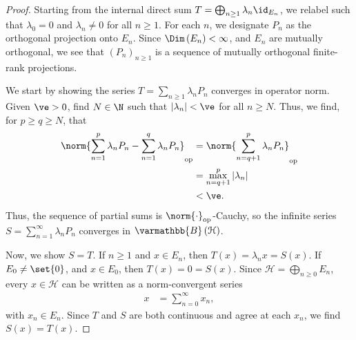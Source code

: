 \documentclass[10pt]{mypackage}
\renewcommand*{\mathbb}[1]{\varmathbb{#1}}
\newcommand{\B}{\mathbb{B}}
\begin{document}
\begin{proof}
  Starting from the internal direct sum $T = \bigoplus_{n\geq 1}\lambda_n\id_{E_n}$, we relabel such that $\lambda_0 = 0$ and $\lambda_n \neq 0$ for all $n\geq 1$. For each $n$, we designate $P_n$ as the orthogonal projection onto $E_n$. Since $\Dim\left(E_n\right) < \infty$, and $E_n$ are mutually orthogonal, we see that $\left(P_n\right)_{n\geq 1}$ is a sequence of mutually orthogonal finite-rank projections.\newline

  We start by showing the series $T = \sum_{n \geq 1}\lambda_nP_n$ converges in operator norm. Given $\ve > 0$, find $N\in \N$ such that $\left\vert \lambda_n \right\vert < \ve$ for all $n\geq N$. Thus, we find, for $p\geq q \geq N$, that
  \begin{align*}
    \norm{\sum_{n=1}^{p}\lambda_nP_n - \sum_{n=1}^{q}\lambda_nP_n}_{\text{op}} &= \norm{\sum_{n=q+1}^{p}\lambda_nP_n}_{\text{op}}\\
                                                                               &= \max_{n=q+1}^{p}\left\vert \lambda_n \right\vert\\
                                                                               & < \ve.
  \end{align*}
  Thus, the sequence of partial sums is $\norm{\cdot}_{\text{op}}$-Cauchy, so the infinite series $S = \sum_{n=1}^{\infty}\lambda_nP_n$ converges in $\B\left(\mathcal{H}\right)$.\newline

  Now, we show $S = T$. If $n\geq 1$ and $x\in E_n$, then $T\left(x\right) = \lambda_n x = S\left(x\right)$. If $E_0 \neq \set{0}$, and $x\in E_0$, then $T\left(x\right) = 0 = S\left(x\right)$. Since $\mathcal{H} = \bigoplus_{n\geq 0}E_n$, every $x\in \mathcal{H}$ can be written as a norm-convergent series
  \begin{align*}
    x &= \sum_{n=0}^{\infty}x_n,
  \end{align*}
  with $x_n\in E_n$. Since $T$ and $S$ are both continuous and agree at each $x_n$, we find $S(x) = T(x)$.\newline


\end{proof}
\end{document}

